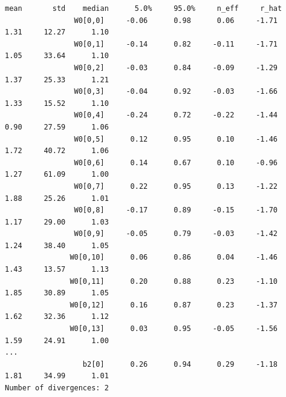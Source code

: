 \documentclass{article}
\begin{document}
\begin{lstlisting}[caption= {Results of Inference with HMC},captionpos=t]
                             mean       std    median      5.0%     95.0%     n_eff     r_hat
                W0[0,0]     -0.06      0.98      0.06     -1.71      1.31     12.27      1.10
                W0[0,1]     -0.14      0.82     -0.11     -1.71      1.05     33.64      1.10
                W0[0,2]     -0.03      0.84     -0.09     -1.29      1.37     25.33      1.21
                W0[0,3]     -0.04      0.92     -0.03     -1.66      1.33     15.52      1.10
                W0[0,4]     -0.24      0.72     -0.22     -1.44      0.90     27.59      1.06
                W0[0,5]      0.12      0.95      0.10     -1.46      1.72     40.72      1.06
                W0[0,6]      0.14      0.67      0.10     -0.96      1.27     61.09      1.00
                W0[0,7]      0.22      0.95      0.13     -1.22      1.88     25.26      1.01
                W0[0,8]     -0.17      0.89     -0.15     -1.70      1.17     29.00      1.03
                W0[0,9]     -0.05      0.79     -0.03     -1.42      1.24     38.40      1.05
               W0[0,10]      0.06      0.86      0.04     -1.46      1.43     13.57      1.13
               W0[0,11]      0.20      0.88      0.23     -1.10      1.85     30.89      1.05
               W0[0,12]      0.16      0.87      0.23     -1.37      1.62     32.36      1.12
               W0[0,13]      0.03      0.95     -0.05     -1.56      1.59     24.91      1.00
...
                  b2[0]      0.26      0.94      0.29     -1.18      1.81     34.99      1.01
Number of divergences: 2
\end{lstlisting}
\end{document}
